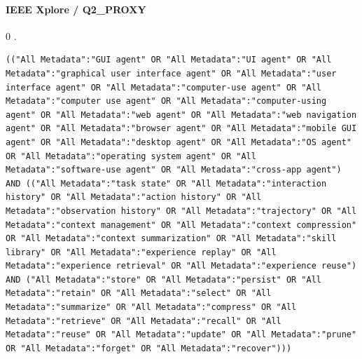 \noindent\begin{minipage}{\linewidth}
\paragraph{IEEE Xplore / Q2\_PROXY}
0 .
\begin{lstlisting}
(("All Metadata":"GUI agent" OR "All Metadata":"UI agent" OR "All Metadata":"graphical user interface agent" OR "All Metadata":"user interface agent" OR "All Metadata":"computer-use agent" OR "All Metadata":"computer use agent" OR "All Metadata":"computer-using agent" OR "All Metadata":"web agent" OR "All Metadata":"web navigation agent" OR "All Metadata":"browser agent" OR "All Metadata":"mobile GUI agent" OR "All Metadata":"desktop agent" OR "All Metadata":"OS agent" OR "All Metadata":"operating system agent" OR "All Metadata":"software-use agent" OR "All Metadata":"cross-app agent") AND (("All Metadata":"task state" OR "All Metadata":"interaction history" OR "All Metadata":"action history" OR "All Metadata":"observation history" OR "All Metadata":"trajectory" OR "All Metadata":"context management" OR "All Metadata":"context compression" OR "All Metadata":"context summarization" OR "All Metadata":"skill library" OR "All Metadata":"experience replay" OR "All Metadata":"experience retrieval" OR "All Metadata":"experience reuse") AND ("All Metadata":"store" OR "All Metadata":"persist" OR "All Metadata":"retain" OR "All Metadata":"select" OR "All Metadata":"summarize" OR "All Metadata":"compress" OR "All Metadata":"retrieve" OR "All Metadata":"recall" OR "All Metadata":"reuse" OR "All Metadata":"update" OR "All Metadata":"prune" OR "All Metadata":"forget" OR "All Metadata":"recover")))
\end{lstlisting}
\end{minipage}\par\medskip
